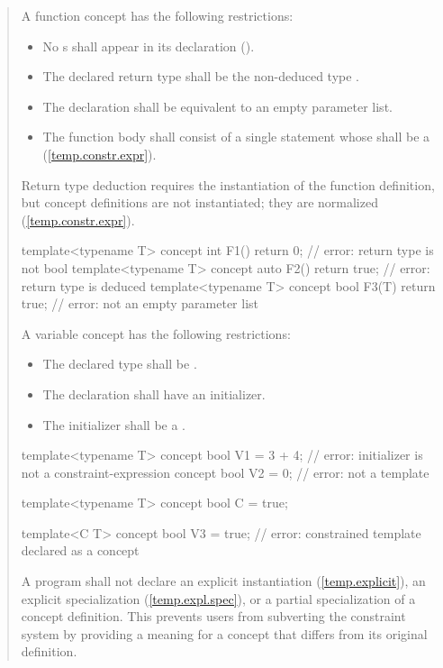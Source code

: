 \begin{quote}
\pnum
A function concept has the following restrictions:
\begin{itemize}
\item No s shall
     appear in its declaration ().
\item The declared return type shall be the non-deduced type .

\item The declaration shall be equivalent to an empty parameter list.

\item The function body shall consist of a single  
statement whose  shall be a
 (\ref{temp.constr.expr}).
\end{itemize}
%
\enternote
Return type deduction requires the instantiation of the function 
definition, but concept definitions are not instantiated; they
are normalized (\ref{temp.constr.expr}).
\exitnote
%
\enterexample
\begin{codeblock}
template<typename T> 
  concept int F1() { return 0; }      // error: return type is not bool
template<typename T> 
  concept auto F2() { return true; }  // error: return type is deduced
template<typename T> 
  concept bool F3(T) { return true; } // error: not an empty parameter list
\end{codeblock}
\exitexample

\pnum
A variable concept has the following restrictions:
\begin{itemize}
\item The declared type shall be .
\item The declaration shall have an initializer.
\item The initializer shall be a .
\end{itemize}
%
\enterexample
\begin{codeblock}
template<typename T> 
  concept bool V1 = 3 + 4; // error: initializer is not a constraint-expression
concept bool V2 = 0;       // error: not a template

template<typename T> concept bool C = true;

template<C T> 
  concept bool V3 = true;  // error: constrained template declared as a concept
\end{codeblock}
\exitexample

\pnum
A program shall not declare an explicit instantiation (\ref{temp.explicit}), 
an explicit specialization (\ref{temp.expl.spec}), or a partial specialization
of a concept definition.
%
\enternote
This prevents users from subverting the constraint system by providing a 
meaning for a concept that differs from its original definition.
\exitnote

\end{quote}
